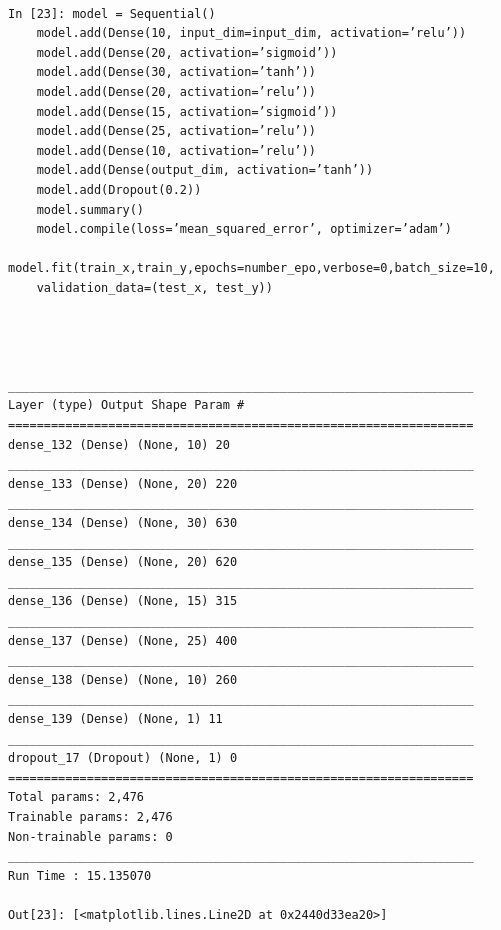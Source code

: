 \documentclass[10pt]{article}
\begin{document}
\begin{verbatim}

In [23]: model = Sequential()
    model.add(Dense(10, input_dim=input_dim, activation=’relu’))
    model.add(Dense(20, activation=’sigmoid’))
    model.add(Dense(30, activation=’tanh’))
    model.add(Dense(20, activation=’relu’))
    model.add(Dense(15, activation=’sigmoid’))
    model.add(Dense(25, activation=’relu’))
    model.add(Dense(10, activation=’relu’))
    model.add(Dense(output_dim, activation=’tanh’))
    model.add(Dropout(0.2))
    model.summary()
    model.compile(loss=’mean_squared_error’, optimizer=’adam’)
    model.fit(train_x,train_y,epochs=number_epo,verbose=0,batch_size=10,
    validation_data=(test_x, test_y))
    
    
    
    
_________________________________________________________________
Layer (type) Output Shape Param #
=================================================================
dense_132 (Dense) (None, 10) 20
_________________________________________________________________
dense_133 (Dense) (None, 20) 220
_________________________________________________________________
dense_134 (Dense) (None, 30) 630
_________________________________________________________________
dense_135 (Dense) (None, 20) 620
_________________________________________________________________
dense_136 (Dense) (None, 15) 315
_________________________________________________________________
dense_137 (Dense) (None, 25) 400
_________________________________________________________________
dense_138 (Dense) (None, 10) 260
_________________________________________________________________
dense_139 (Dense) (None, 1) 11
_________________________________________________________________
dropout_17 (Dropout) (None, 1) 0
=================================================================
Total params: 2,476
Trainable params: 2,476
Non-trainable params: 0
_________________________________________________________________
Run Time : 15.135070

Out[23]: [<matplotlib.lines.Line2D at 0x2440d33ea20>]


\end{verbatim}
\end{document}
